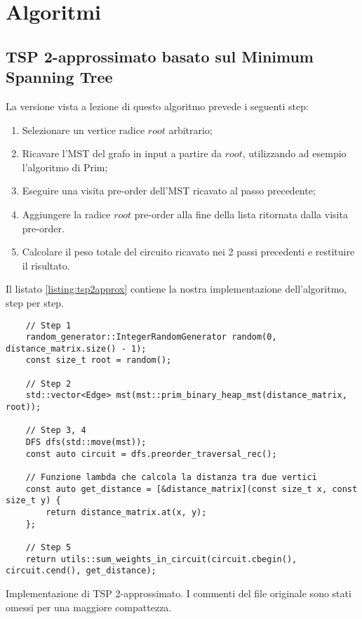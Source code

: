 
\section{Algoritmi}
\label{cap:algorithms}

\subsection{TSP 2-approssimato basato sul Minimum Spanning Tree}

La versione vista a lezione di questo algoritmo prevede i seguenti step:

\begin{enumerate}
    \item Selezionare un vertice radice $root$ arbitrario;
    \item Ricavare l'MST del grafo in input a partire da $root$, utilizzando ad esempio l'algoritmo di Prim;
    \item Eseguire una visita pre-order dell'MST ricavato al passo precedente;
    \item Aggiungere la radice $root$ pre-order alla fine della lista ritornata dalla visita pre-order.
    \item Calcolare il peso totale del circuito ricavato nei 2 passi precedenti e restituire il risultato.
\end{enumerate}

\noindent Il listato \ref{listing:tsp2approx} contiene la nostra implementazione dell'algoritmo, step per step.\\

\begin{listing}[!ht]
\begin{verbatim}
    // Step 1
    random_generator::IntegerRandomGenerator random(0, distance_matrix.size() - 1);
    const size_t root = random();

    // Step 2
    std::vector<Edge> mst(mst::prim_binary_heap_mst(distance_matrix, root));

    // Step 3, 4
    DFS dfs(std::move(mst));
    const auto circuit = dfs.preorder_traversal_rec();
    
    // Funzione lambda che calcola la distanza tra due vertici
    const auto get_distance = [&distance_matrix](const size_t x, const size_t y) {
        return distance_matrix.at(x, y);
    };
    
    // Step 5
    return utils::sum_weights_in_circuit(circuit.cbegin(), circuit.cend(), get_distance);
\end{verbatim}
\caption{Implementazione di TSP 2-approssimato. I commenti del file originale sono stati omessi per una maggiore compattezza.}
\label{listing:tsp2approx}
\end{listing}

